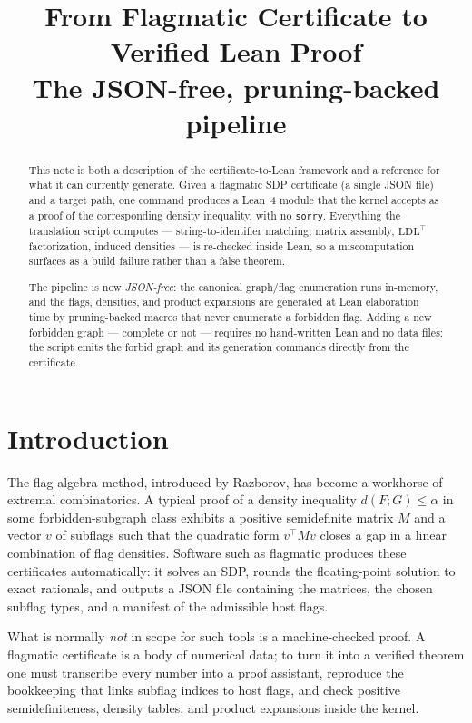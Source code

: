 \documentclass[11pt]{article}
\title{From Flagmatic Certificate to Verified Lean Proof\\
       \large The JSON-free, pruning-backed pipeline}
\author{}
\date{}
\begin{document}
\maketitle

\begin{abstract}
\noindent
This note is both a description of the certificate-to-Lean framework and a
reference for what it can currently generate. Given a flagmatic SDP
certificate (a single JSON file) and a target path, one command produces a
Lean~4 module that the kernel accepts as a proof of the corresponding density
inequality, with no \texttt{sorry}. Everything the translation script computes
--- string-to-identifier matching, matrix assembly, $\mathrm{LDL}^\top$
factorization, induced densities --- is re-checked inside Lean, so a
miscomputation surfaces as a build failure rather than a false theorem.

The pipeline is now \emph{JSON-free}: the canonical graph/flag enumeration runs
in-memory, and the flags, densities, and product expansions are generated at
Lean elaboration time by pruning-backed macros that never enumerate a forbidden
flag. Adding a new forbidden graph --- complete or not --- requires no
hand-written Lean and no data files: the script emits the forbid graph and its
generation commands directly from the certificate.
\end{abstract}

\section{Introduction}

The flag algebra method, introduced by Razborov, has become a workhorse of
extremal combinatorics. A typical proof of a density inequality
$d(F;G) \le \alpha$ in some forbidden-subgraph class exhibits a positive
semidefinite matrix $M$ and a vector $v$ of subflags such that the quadratic
form $v^\top M v$ closes a gap in a linear combination of flag densities.
Software such as flagmatic produces these certificates automatically: it solves
an SDP, rounds the floating-point solution to exact rationals, and outputs a
JSON file containing the matrices, the chosen subflag types, and a manifest of
the admissible host flags.

What is normally \emph{not} in scope for such tools is a machine-checked proof.
A flagmatic certificate is a body of numerical data; to turn it into a verified
theorem one must transcribe every number into a proof assistant, reproduce the
bookkeeping that links subflag indices to host flags, and check positive
semidefiniteness, density tables, and product expansions inside the kernel.
\end{document}
